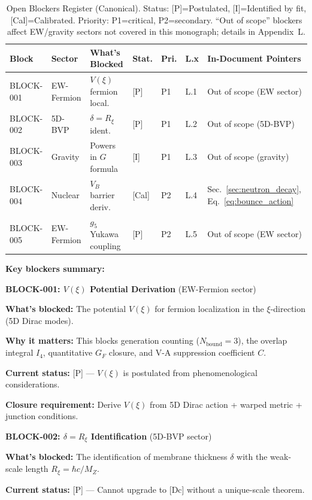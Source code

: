 \documentclass[11pt,a4paper]{article}
\begin{document}
\begin{table}[h]
\centering
\footnotesize
\begin{tabular}{p{1.4cm}p{1.5cm}p{2.8cm}p{0.7cm}p{0.5cm}p{0.5cm}p{3.2cm}}
\toprule
\textbf{Block} & \textbf{Sector} & \textbf{What's Blocked} & \textbf{Stat.} & \textbf{Pri.} & \textbf{L.x} & \textbf{In-Document Pointers} \\
\midrule
BLOCK-001 & EW-Fermion & $V(\xi)$ fermion local. & [P] & P1 & L.1 & Out of scope (EW sector) \\
BLOCK-002 & 5D-BVP & $\delta = R_\xi$ ident. & [P] & P1 & L.2 & Out of scope (5D-BVP) \\
BLOCK-003 & Gravity & Powers in $G$ formula & [I] & P1 & L.3 & Out of scope (gravity) \\
BLOCK-004 & Nuclear & $V_B$ barrier deriv. & [Cal] & P2 & L.4 & Sec.~\ref{sec:neutron_decay}, Eq.~\ref{eq:bounce_action} \\
BLOCK-005 & EW-Fermion & $g_5$ Yukawa coupling & [P] & P2 & L.5 & Out of scope (EW sector) \\
\bottomrule
\end{tabular}
\caption{Open Blockers Register (Canonical). Status: [P]=Postulated, [I]=Identified by fit, [Cal]=Calibrated. Priority: P1=critical, P2=secondary. ``Out of scope'' blockers affect EW/gravity sectors not covered in this monograph; details in Appendix~L.}
\label{tab:blockers_register}
\end{table}

\textbf{Key blockers summary:}

\begin{warnbox}
\textbf{BLOCK-001: $V(\xi)$ Potential Derivation} (EW-Fermion sector)

\textbf{What's blocked:} The potential $V(\xi)$ for fermion localization in the $\xi$-direction (5D Dirac modes).

\textbf{Why it matters:} This blocks generation counting ($N_{\text{bound}} = 3$), the overlap integral $I_4$, quantitative $G_F$ closure, and V-A suppression coefficient $C$.

\textbf{Current status:} [P] --- $V(\xi)$ is postulated from phenomenological considerations.

\textbf{Closure requirement:} Derive $V(\xi)$ from 5D Dirac action + warped metric + junction conditions.
\end{warnbox}

\begin{warnbox}
\textbf{BLOCK-002: $\delta = R_\xi$ Identification} (5D-BVP sector)

\textbf{What's blocked:} The identification of membrane thickness $\delta$ with the weak-scale length $R_\xi = \hbar c / M_Z$.

\textbf{Current status:} [P] --- Cannot upgrade to [Dc] without a unique-scale theorem.
\end{warnbox}
\end{document}
